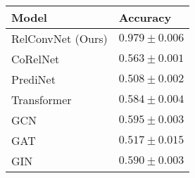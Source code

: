 \begin{tabular}{ll}
\toprule
Model & Accuracy\\
\midrule
RelConvNet (Ours)  &  $0.979 \pm 0.006$ \\
CoRelNet~\citep{kergNeuralArchitecture2022} &  $0.563 \pm 0.001$ \\
PrediNet~\citep{shanahanExplicitlyRelationalNeural} &  $0.508 \pm 0.002$ \\
Transformer~\citep{vaswani2017attention} &  $0.584 \pm 0.004$ \\
GCN~\citep{kipfSemiSupervisedClassificationGraph2017} &  $0.595 \pm 0.003$ \\
GAT~\citep{velickovicGraphAttentionNetworks2017} &  $0.517 \pm 0.015$ \\
GIN~\citep{xuHowPowerfulAre2018} &  $0.590 \pm 0.003$ \\
\bottomrule
\end{tabular}
